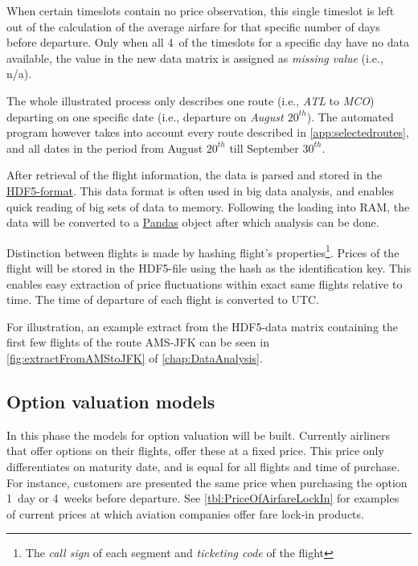 When certain timeslots contain no price observation, this single timeslot is left out of the calculation of the average airfare for that specific number of days before departure. Only when all 4~of the timeslots for a specific day have no data available, the value in the new data matrix is assigned as \emph{missing value} (i.e., n/a). 

The whole illustrated process only describes one route (i.e., \emph{ATL} to \emph{MCO}) departing on one specific date (i.e., departure on \emph{August $20^{th}$}). The automated program however takes into account every route described in \autoref{app:selectedroutes}, and all dates in the period from August $20^{th}$ till September $30^{th}$.

After retrieval of the flight information, the data is parsed and stored in the \href{http://www.hdfgroup.org/HDF5/}{HDF5-format}. This data format is often used in big data analysis, and enables quick reading of big sets of data to memory. Following the loading into RAM, the data will be converted to a \href{http://pandas.pydata.org/}{Pandas} object after which analysis can be done.

Distinction between flights is made by hashing flight's  properties\footnote{The \emph{call sign} of each segment and \emph{ticketing code} of the flight}. Prices of the flight will be stored in the HDF5-file using the hash as the identification key. This enables easy extraction of price fluctuations within exact same flights relative to time. The time of departure of each flight is converted to UTC.

For illustration, an example extract from the HDF5-data matrix containing the first few flights of the route AMS-JFK can be seen in \autoref{fig:extractFromAMStoJFK} of \autoref{chap:DataAnalysis}.


\subsection{Option valuation models}
\label{subsec:OptionValuationModels}

In this phase the models for option valuation will be built. Currently airliners that offer options on their flights, offer these at a fixed price. This price only differentiates on maturity date, and is equal for all flights and time of purchase. For instance, customers are presented the same price when purchasing the option 1~day or 4~weeks before departure. See \autoref{tbl:PriceOfAirfareLockIn} for examples of current prices at which aviation companies offer fare lock-in products.

